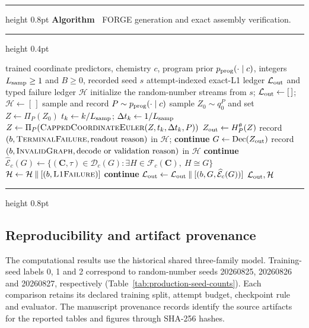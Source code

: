 \documentclass{article}
\theoremstyle{definition}
\begin{document}
\begingroup
\setlength{\parskip}{0pt}
\hrule height 0.8pt\kern 2pt
\noindent\textbf{Algorithm~\thealgorithm} FORGE generation and exact assembly verification.
\label{alg:forge-inference}
\par\nobreak\kern 2pt\hrule height 0.4pt\nobreak
\begin{algorithmic}[1]
\Require trained coordinate predictors, chemistry $c$, program prior $p_{\rm prog}(\cdot\mid c)$,
integers $L_{\rm samp}\geq1$ and $B\geq0$, recorded seed $s$
\Ensure attempt-indexed exact-L1 ledger $\mathcal L_{\rm out}$ and typed failure ledger $\mathcal H$
\State initialize the random-number streams from $s$;
$\mathcal L_{\rm out}\gets[\,]$; $\mathcal H\gets[\,]$
    \State sample and record $P\sim p_{\rm prog}(\cdot\mid c)$
    \State sample $Z_0\sim q_0^P$ and set $Z\gets\Pi_P(Z_0)$
        \State $t_k\gets k/L_{\rm samp}$; $\Delta t_k\gets1/L_{\rm samp}$
        \State $Z\gets\Pi_P\!\left(\Call{CappedCoordinateEuler}{Z,t_k,\Delta t_k,P}\right)$
    \EndFor
    \State $Z_{\rm out}\gets H_P^\theta(Z)$ 
        \State record $(b,\textsc{TerminalFailure},\text{readout reason})$ in $\mathcal H$; \textbf{continue}
    \EndIf
    \State $G\gets\operatorname{Dec}(Z_{\rm out})$
        \State record $(b,\textsc{InvalidGraph},\text{decode or validation reason})$ in $\mathcal H$
        \State \textbf{continue}
    \EndIf
    \State $\widehat{\mathcal{E}}_c(G)\gets
    \{(\mathbf C,\tau)\in\mathcal D_c(G):\exists H\in\mathcal F_c(\mathbf C),\ H\cong G\}$
        \State $\mathcal H\gets\mathcal H\mathbin{\|}[(b,\textsc{L1Failure})]$
        \State \textbf{continue}
    \EndIf
    \State $\mathcal L_{\rm out}\gets\mathcal L_{\rm out}\mathbin{\|}
    [(b,G,\widehat{\mathcal E}_c(G))]$
\EndFor
\State \Return $\mathcal L_{\rm out},\mathcal H$
\end{algorithmic}
\nopagebreak\hrule height 0.8pt
\endgroup

\subsection{Reproducibility and artifact provenance}
\label{app:repro}

The computational results use the historical shared three-family model. Training-seed labels
0, 1 and 2 correspond to random-number seeds 20260825, 20260826 and 20260827, respectively
(Table~\ref{tab:production-seed-counts}). Each comparison retains its declared training split,
attempt budget, checkpoint rule and evaluator. The manuscript provenance records identify the
source artifacts for the reported tables and figures through SHA-256 hashes.
\end{document}
